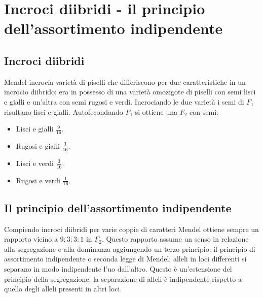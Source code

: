 \section{Incroci diibridi - il principio dell'assortimento indipendente}
\subsection{Incroci diibridi}
Mendel incrocia variet\`a di piselli che differiscono per due caratteristiche in un incrocio diibrido: era in possesso di una variet\`a omozigote di piselli con semi lisci e gialli e un'altra con
semi rugosi e verdi. Incrociando le due variet\`a i semi di $F_1$ risultano lisci e gialli. Autofecondando $F_1$ si ottiene una $F_2$ con semi:
\begin{multicols}{2}
	\begin{itemize}
		\item Lisci e gialli $\frac{9}{16}$.
		\item Rugosi e gialli $\frac{3}{16}$.
		\item Lisci e verdi $\frac{3}{16}$.
		\item Rugosi e verdi $\frac{1}{16}$.
	\end{itemize}
\end{multicols}
\subsection{Il principio dell'assortimento indipendente}
Compiendo incroci diibridi per varie coppie di caratteri Mendel ottiene sempre un rapporto vicino a $9:3:3:1$ in $F_2$. Questo rapporto assume un senso in relazione alla segregazione e alla dominanza 
aggiungendo un terzo principio: il principio di assortimento indipendente o seconda legge di Mendel: alleli in loci differenti si separano in modo indipendente l'uo dall'altro. Questo \`e un'estensione
del principio della segregazione: la separazione di alleli \`e indipendente rispetto a quella degli alleli presenti in altri loci. 
